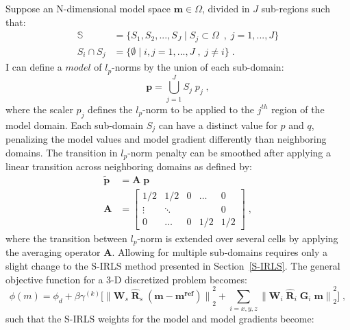 Suppose an N-dimensional model space $\mathbf{m} \in \Omega$, divided in $J$ sub-regions such that:
\begin{equation*}\label{eq:Subsets}
\begin{split}
	\mathbb{S} & = \{S_1, S_2, ... , S_J \;\Big| \;S_j \subset \Omega\ \;,\; j = 1,...,J\} \\
	S_i \cap S_j &=  \{\emptyset \;\Big| \;i,j = 1,...,J \;,\; j \neq i\}\;.
\end{split}
\end{equation*}
I can define a $model$ of $l_p$-norms by the union of each sub-domain:
\begin{equation}\label{p_vector}
\mathbf{p} = \bigcup_{j=1}^J S_j\;p_j\;,
\end{equation}
where the scaler $p_j$ defines the $l_p$-norm to be applied to the $j^{th}$ region of the model domain. 
Each sub-domain $S_j$ can have a distinct value for $p$ and $q$, penalizing the model values and model gradient differently than neighboring domains.
The transition in $l_p$-norm penalty can be smoothed after applying a linear transition across neighboring domains as defined by:
\begin{equation}\label{smooth_p_vector}
\begin{split}
\mathbf{\tilde p} &= \mathbf{A\;p} \\
\mathbf{A} &= 
		\begin{bmatrix}
			1/2 		& 		1/2	&  	0		& \dots  		&  0 \\
			\vdots	&  		 \ddots	&  	&   &  0\\
			0 		& 	\dots		& 		0	& 1/2 &  1/2 
		 \end{bmatrix} \;,
		 \end{split}
\end{equation}
where the transition between $l_p$-norm is extended over several cells by applying the averaging operator $\mathbf{A}$.
Allowing for multiple sub-domains requires only a slight change to the S-IRLS method presented in Section~\ref{S-IRLS}.
The general objective function for a 3-D discretized problem becomes:
 \begin{equation} \label{eq:Phi_IRLS}
\phi(m) =  \phi_d + \beta \gamma^{(k)} \Big [ {\| \mathbf{W}_s\;  \mathbf{\hat R}_s \;( \mathbf{m - m^{ref}})\|}^2_2  + \sum_{i = x,y,z}  {\|   \mathbf{W}_i \;  \mathbf{\hat R}_i  \; \mathbf{G}_i \; \mathbf{m}\|}^2_2  \Big ]\;,
\end{equation}
 such that the S-IRLS weights for the model and model gradients become:
